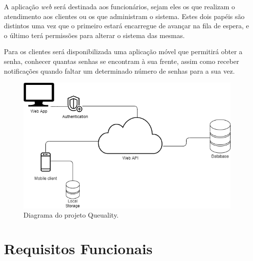 \documentclass[12pt,a4paper]{article}
\begin{document}
A aplicação \textit{web} será destinada aos funcionários, sejam eles os que realizam o atendimento aos
clientes ou os que administram o sistema. Estes dois papéis são distintos uma vez que o primeiro estará
encarregue de avançar na fila de espera, e o último terá permissões para alterar o sistema das mesmas.

Para os clientes será disponibilizada uma aplicação móvel que permitirá obter a senha, conhecer
quantas senhas se encontram à sua frente, assim como receber notificações quando faltar um
determinado número de senhas para a sua vez.

\begin{figure}[h]
    \centering
    \includegraphics[scale=0.75]{images/Diagrama-do-projeto}
    \caption{Diagrama do projeto Queuality.}
    \label{fig:diagrama}
\end{figure}

\pagebreak
\section{Requisitos Funcionais}
\end{document}
